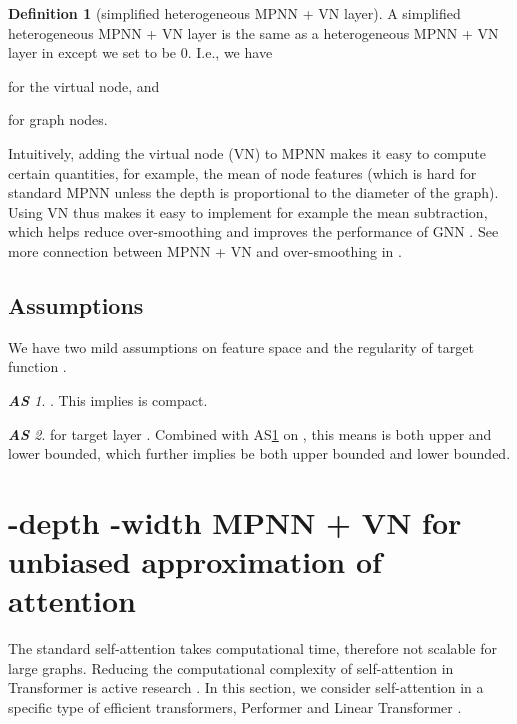 \documentclass[nohyperref]{article}
\theoremstyle{plain}
\theoremstyle{definition}
\newtheorem{definition}[theorem]{Definition}
\theoremstyle{remark}
\newtheorem{assumption}{\hspace{0pt}\bf AS\hspace{-0.075cm}}
\begin{document}
\begin{definition}[simplified heterogeneous MPNN + VN layer]
\label{def:simplified-hetero-mpnn-vn}
A simplified heterogeneous MPNN + VN layer is the same as a heterogeneous MPNN + VN layer in  except we set  to be 0. I.e., we have

for the virtual node, and

for graph nodes. 
\end{definition}

Intuitively, adding the virtual node (VN) to MPNN makes it easy to compute certain quantities, for example, the mean of node features (which is hard for standard MPNN unless the depth is proportional to the diameter of the graph). Using VN thus makes it easy to implement for example the mean subtraction, which helps reduce over-smoothing and improves the performance of GNN \citep{yang2020revisiting,zhao2019pairnorm}. See more connection between MPNN + VN and over-smoothing in . 




\subsection{Assumptions}
We have two mild assumptions on feature space  and the regularity of target function .

\begin{assumption}\label{AS-2} . This implies  is compact.  
\end{assumption} 

\begin{assumption}\label{AS-3}   for target layer . Combined with AS\ref{AS-2} on , this means  is both upper and lower bounded, which further implies  be both upper bounded and lower bounded. 
\end{assumption}
   

\section{-depth -width MPNN + VN for unbiased approximation of attention}
\label{sec:shallow-narrow-attention}
The standard self-attention takes  computational time, therefore not scalable for large graphs. Reducing the computational complexity of self-attention in Transformer is active research \citep{tay2020efficient}. 
In this section, we consider self-attention in a specific type of efficient transformers, Performer \citep{choromanski2020rethinking} and Linear Transformer \citep{katharopoulos2020transformers}. 
\end{document}
